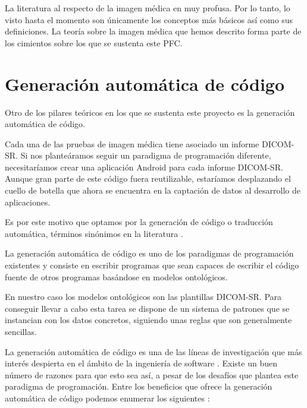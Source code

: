 La literatura al respecto de la imagen médica en muy profusa. Por lo tanto, lo visto hasta el momento son únicamente los conceptos más básicos así como sus definiciones. La teoría sobre la imagen médica que hemos descrito forma parte de los cimientos sobre los que se sustenta este PFC.\par

\section{Generación automática de código}\label{sec:generacion-codigo}
Otro de los pilares teóricos en los que se sustenta este proyecto es la generación automática de código.\par
Cada una de las pruebas de imagen médica tiene asociado un informe DICOM-SR. Si nos planteáramos seguir un paradigma de programación diferente, necesitaríamos crear una aplicación Android para cada informe DICOM-SR. Aunque gran parte de este código fuera reutilizable, estaríamos desplazando el cuello de botella que ahora se encuentra en la captación de datos al desarrollo de aplicaciones.\par
Es por este motivo que optamos por la generación de código o traducción automática, términos sinónimos en la literatura \cite{802346}.\medskip\par 
La generación automática de código es uno de los paradigmas de programación existentes y consiste en escribir programas que sean capaces de escribir el código fuente de otros programas basándose en modelos ontológicos.\par 
En nuestro caso los modelos ontológicos son las plantillas DICOM-SR. Para conseguir llevar a cabo esta tarea se dispone de un sistema de patrones que se instancian con los datos concretos, siguiendo unas reglas que son generalmente sencillas.\medskip\par
La generación automática de código es una de las líneas de investigación que más interés despierta en el ámbito de la ingeniería de software \cite{hinchey2005requirements}. Existe un buen número de razones para que esto sea así, a pesar de los desafíos que plantea este paradigma de programación. Entre los beneficios que ofrece la generación automática de código podemos enumerar los siguientes \cite{herrington2003code}:
